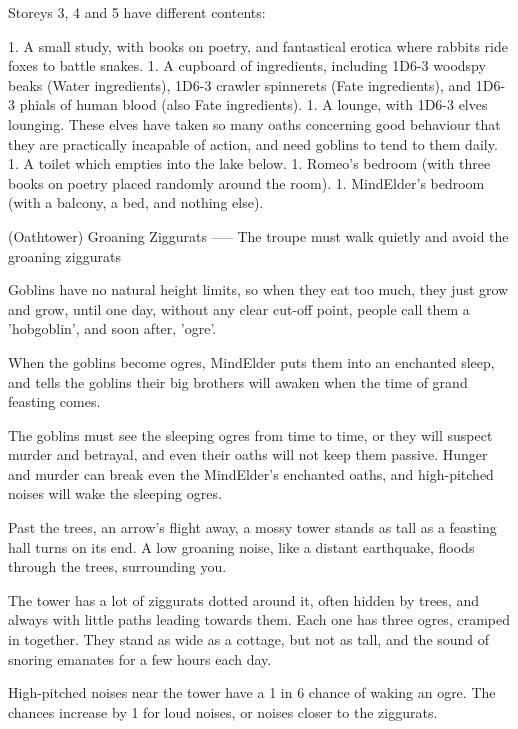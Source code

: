 Storeys 3, 4 and 5 have different contents:

\begin{dlist}
1. A small study, with books on poetry, and fantastical erotica where rabbits ride foxes to battle snakes.
1. A cupboard of \glspl{ingredient}, including 1D6-3 woodspy beaks (Water \glspl{ingredient}), 1D6-3 \gls{crawler} spinnerets (Fate \glspl{ingredient}), and 1D6-3 phials of human blood (also Fate \glspl{ingredient}).
1. A lounge, with 1D6-3 elves lounging.  These elves have taken so many oaths concerning good behaviour that they are practically incapable of action, and need goblins to tend to them daily.
1. A toilet which empties into the lake below.
1. Romeo's bedroom (with three books on poetry placed randomly around the room).
1. MindElder's bedroom (with a balcony, a bed, and nothing else).
\end{dlist}

(Oathtower) Groaning Ziggurats
-----
{The troupe must walk quietly and avoid the groaning ziggurats}

Goblins have no natural height limits, so when they eat too much, they just grow and grow, until one day, without any clear cut-off point, people call them a 'hobgoblin', and soon after, 'ogre'.

When the goblins become ogres, MindElder puts them into an enchanted sleep, and tells the goblins their big brothers will awaken when the time of grand feasting comes.

The goblins must see the sleeping ogres from time to time, or they will suspect murder and betrayal, and even their oaths will not keep them passive.
Hunger and murder can break even the MindElder's enchanted oaths, and high-pitched noises will wake the sleeping ogres.

\begin{boxtext}
  Past the trees, an arrow's flight away, a mossy tower stands as tall as a feasting hall turns on its end.
  A low groaning noise, like a distant earthquake, floods through the trees, surrounding you.
\end{boxtext}

The tower has a lot of ziggurats dotted around it, often hidden by trees, and always with little paths leading towards them.
Each one has three ogres, cramped in together.
They stand as wide as a cottage, but not as tall, and the sound of snoring emanates for a few hours each day.

High-pitched noises near the tower
have a 1 in 6 chance of waking an ogre.
The chances increase by 1 for loud noises, or noises closer to the ziggurats.

